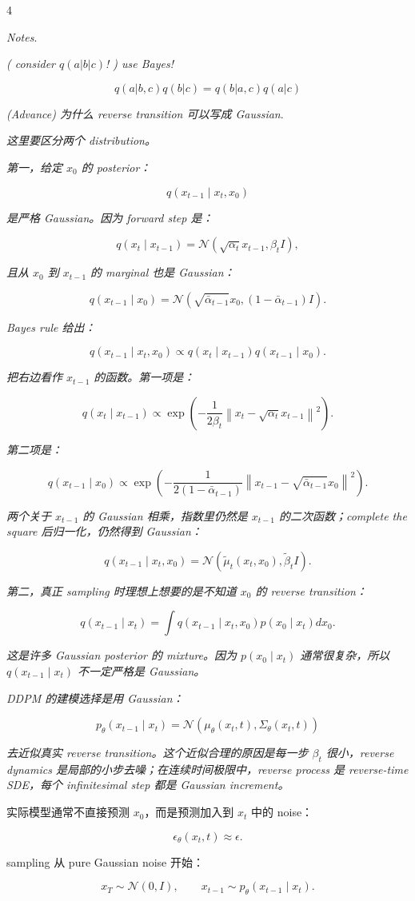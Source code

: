 \documentclass[8pt,a4paper,landscape]{extarticle}
\newcommand{\Body}[1]{{\tiny #1\par}}
\begin{document}
\begin{multicols*}{4}
\Body{\emph{Notes}.}
\Body{\emph{}}
\Body{\emph{( consider ${}q(a|b|c)$! ) use Bayes!}}
\[
q(a|b,c)q(b|c) = q(b|a,c)q(a|c)
\]
\Body{\emph{(Advance) 为什么 reverse transition 可以写成 Gaussian}.}
\Body{\emph{这里要区分两个 distribution。}}
\Body{\emph{}}
\Body{\emph{第一，给定 $x_0$ 的 posterior：}}
\Body{\emph{}}
\[
q(x_{t-1}\mid x_t,x_0)
\]
\Body{\emph{}}
\Body{\emph{是严格 Gaussian。因为 forward step 是：}}
\Body{\emph{}}
\[
q(x_t\mid x_{t-1})
=
\mathcal{N}(\sqrt{\alpha_t}x_{t-1},\beta_tI),
\]
\Body{\emph{}}
\Body{\emph{且从 $x_0$ 到 $x_{t-1}$ 的 marginal 也是 Gaussian：}}
\Body{\emph{}}
\[
q(x_{t-1}\mid x_0)
=
\mathcal{N}
\left(
\sqrt{\bar{\alpha}_{t-1}}x_0,
(1-\bar{\alpha}_{t-1})I
\right).
\]
\Body{\emph{}}
\Body{\emph{Bayes rule 给出：}}
\Body{\emph{}}
\[
q(x_{t-1}\mid x_t,x_0)
\propto
q(x_t\mid x_{t-1})q(x_{t-1}\mid x_0).
\]
\Body{\emph{}}
\Body{\emph{把右边看作 $x_{t-1}$ 的函数。第一项是：}}
\Body{\emph{}}
\[
q(x_t\mid x_{t-1})
\propto
\exp
\left(
-
\frac{1}{2\beta_t}
\left\|
x_t-\sqrt{\alpha_t}x_{t-1}
\right\|^2
\right).
\]
\Body{\emph{}}
\Body{\emph{第二项是：}}
\Body{\emph{}}
\[
q(x_{t-1}\mid x_0)
\propto
\exp
\left(
-
\frac{1}{2(1-\bar{\alpha}_{t-1})}
\left\|
x_{t-1}-\sqrt{\bar{\alpha}_{t-1}}x_0
\right\|^2
\right).
\]
\Body{\emph{}}
\Body{\emph{两个关于 $x_{t-1}$ 的 Gaussian 相乘，指数里仍然是 $x_{t-1}$ 的二次函数；complete the square 后归一化，仍然得到 Gaussian：}}
\Body{\emph{}}
\[
q(x_{t-1}\mid x_t,x_0)
=
\mathcal{N}(\tilde{\mu}_t(x_t,x_0),\tilde{\beta}_tI).
\]
\Body{\emph{}}
\Body{\emph{第二，真正 sampling 时理想上想要的是不知道 $x_0$ 的 reverse transition：}}
\Body{\emph{}}
\[
q(x_{t-1}\mid x_t)
=
\int q(x_{t-1}\mid x_t,x_0)p(x_0\mid x_t)dx_0.
\]
\Body{\emph{}}
\Body{\emph{这是许多 Gaussian posterior 的 mixture。因为 $p(x_0\mid x_t)$ 通常很复杂，所以 $q(x_{t-1}\mid x_t)$ 不一定严格是 Gaussian。}}
\Body{\emph{}}
\Body{\emph{DDPM 的建模选择是用 Gaussian：}}
\Body{\emph{}}
\[
p_\theta(x_{t-1}\mid x_t)
=
\mathcal{N}(\mu_\theta(x_t,t),\Sigma_\theta(x_t,t))
\]
\Body{\emph{}}
\Body{\emph{去近似真实 reverse transition。这个近似合理的原因是每一步 $\beta_t$ 很小，reverse dynamics 是局部的小步去噪；在连续时间极限中，reverse process 是 reverse-time SDE，每个 infinitesimal step 都是 Gaussian increment。}}
\Body{实际模型通常不直接预测 $x_0$，而是预测加入到 $x_t$ 中的 noise：}
\[
\epsilon_\theta(x_t,t)\approx\epsilon.
\]
\Body{sampling 从 pure Gaussian noise 开始：}
\[
x_T\sim\mathcal{N}(0,I),
\qquad
x_{t-1}\sim p_\theta(x_{t-1}\mid x_t).
\]

\end{multicols*}
\end{document}
